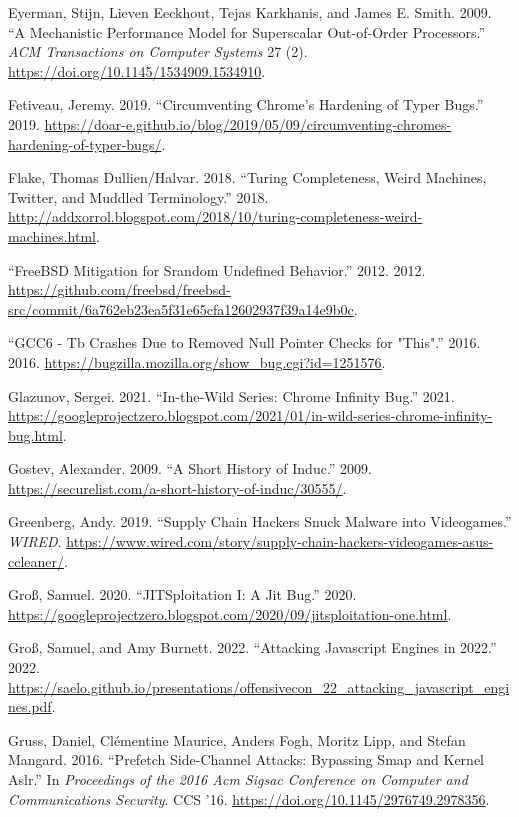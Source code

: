 \documentclass[a4paper,]{report}
\begin{document}
\leavevmode\hypertarget{ref-Eyerman2009}{}%
Eyerman, Stijn, Lieven Eeckhout, Tejas Karkhanis, and James E. Smith.
2009. ``A Mechanistic Performance Model for Superscalar Out-of-Order
Processors.'' \emph{ACM Transactions on Computer Systems} 27 (2).
\url{https://doi.org/10.1145/1534909.1534910}.

\leavevmode\hypertarget{ref-Fetiveau2019}{}%
Fetiveau, Jeremy. 2019. ``Circumventing Chrome's Hardening of Typer
Bugs.'' 2019.
\url{https://doar-e.github.io/blog/2019/05/09/circumventing-chromes-hardening-of-typer-bugs/}.

\leavevmode\hypertarget{ref-Dullien2018}{}%
Flake, Thomas Dullien/Halvar. 2018. ``Turing Completeness, Weird
Machines, Twitter, and Muddled Terminology.'' 2018.
\url{http://addxorrol.blogspot.com/2018/10/turing-completeness-weird-machines.html}.

\leavevmode\hypertarget{ref-FbsdJunk}{}%
``FreeBSD Mitigation for Srandom Undefined Behavior.'' 2012. 2012.
\url{https://github.com/freebsd/freebsd-src/commit/6a762eb23ea5f31e65cfa12602937f39a14e9b0c}.

\leavevmode\hypertarget{ref-MozillaIssue}{}%
``GCC6 - Tb Crashes Due to Removed Null Pointer Checks for "This".''
2016. 2016. \url{https://bugzilla.mozilla.org/show_bug.cgi?id=1251576}.

\leavevmode\hypertarget{ref-Glazunov2021}{}%
Glazunov, Sergei. 2021. ``In-the-Wild Series: Chrome Infinity Bug.''
2021.
\url{https://googleprojectzero.blogspot.com/2021/01/in-wild-series-chrome-infinity-bug.html}.

\leavevmode\hypertarget{ref-Gostev2009}{}%
Gostev, Alexander. 2009. ``A Short History of Induc.'' 2009.
\url{https://securelist.com/a-short-history-of-induc/30555/}.

\leavevmode\hypertarget{ref-Greenberg2019}{}%
Greenberg, Andy. 2019. ``Supply Chain Hackers Snuck Malware into
Videogames.'' \emph{WIRED}.
\url{https://www.wired.com/story/supply-chain-hackers-videogames-asus-ccleaner/}.

\leavevmode\hypertarget{ref-Grouxdf2020}{}%
Groß, Samuel. 2020. ``JITSploitation I: A Jit Bug.'' 2020.
\url{https://googleprojectzero.blogspot.com/2020/09/jitsploitation-one.html}.

\leavevmode\hypertarget{ref-Grouxdf2022}{}%
Groß, Samuel, and Amy Burnett. 2022. ``Attacking Javascript Engines in
2022.'' 2022.
\url{https://saelo.github.io/presentations/offensivecon_22_attacking_javascript_engines.pdf}.

\leavevmode\hypertarget{ref-Gruss2016}{}%
Gruss, Daniel, Clémentine Maurice, Anders Fogh, Moritz Lipp, and Stefan
Mangard. 2016. ``Prefetch Side-Channel Attacks: Bypassing Smap and
Kernel Aslr.'' In \emph{Proceedings of the 2016 Acm Sigsac Conference on
Computer and Communications Security}. CCS '16.
\url{https://doi.org/10.1145/2976749.2978356}.
\end{document}

